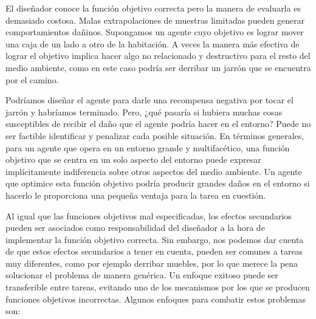 \documentclass[12pt,a4paper]{article}
\begin{document}
El diseñador conoce la función objetivo correcta pero la manera de evaluarla es demasiado costosa. Malas extrapolaciones de muestras limitadas pueden generar comportamientos dañinos. Supongamos un agente cuyo objetivo es lograr mover una caja de un lado a otro de la habitación. A veces la manera más efectiva de lograr el objetivo implica hacer algo no relacionado y destructivo para el resto del medio ambiente, como en este caso podría ser derribar un jarrón que se encuentra por el camino.

Podríamos diseñar el agente para darle una recompensa negativa por tocar el jarrón y habríamos terminado. Pero, ¿qué pasaría si hubiera muchas cosas susceptibles de recibir el daño que el agente podría hacer en el entorno? Puede no ser factible identificar y penalizar cada posible situación. En términos generales, para un agente que opera en un entorno grande y multifacético, una función objetivo que se centra en un solo aspecto del entorno puede expresar implícitamente indiferencia sobre otros aspectos del medio ambiente. Un agente que optimice esta función objetivo podría producir grandes daños en el entorno si hacerlo le proporciona una pequeña ventaja para la tarea en cuestión.

Al igual que las funciones objetivos mal especificadas, los efectos secundarios pueden ser asociados como responsabilidad del diseñador a la hora de implementar la función objetivo correcta. Sin embargo, nos podemos dar cuenta de que estos efectos secundarios a tener en cuenta, pueden ser comunes a tareas muy diferentes, como por ejemplo derribar muebles, por lo que merece la pena solucionar el problema de manera genérica. Un enfoque exitoso puede ser transferible entre tareas, evitando uno de los mecanismos por los que se producen funciones objetivos incorrectas. Algunos enfoques para combatir estos problemas son:
\end{document}
